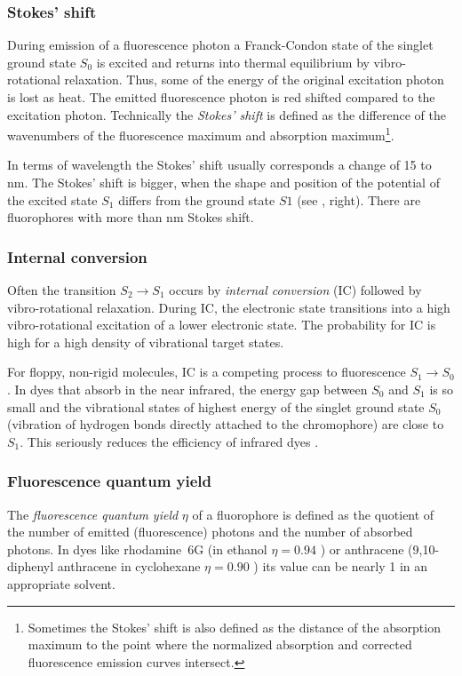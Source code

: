 \subsubsection{Stokes' shift}
During emission of a fluorescence photon a Franck-Condon state of the
singlet ground state $S_0$ is excited and returns into thermal
equilibrium by vibro-rotational relaxation. Thus, some of the energy
of the original excitation photon is lost as heat. The emitted
fluorescence photon is red shifted compared to the excitation
photon. Technically the \emph{Stokes' shift} is defined as the
difference of the wavenumbers of the fluorescence maximum and
absorption maximum\footnote{Sometimes the Stokes' shift is also defined
  as the distance of the absorption maximum to the point where the
  normalized absorption and corrected fluorescence emission curves intersect.}.

In terms of wavelength the Stokes' shift usually corresponds a change
of 15 to \unit[30]{nm}. The Stokes' shift is bigger, when the shape and
position of the potential of the excited state $S_1$ differs from the
ground state $S1$ (see , right). There are
fluorophores with more than \unit[100]{nm} Stokes shift.

\subsubsection{Internal conversion}
Often the transition $S_2\rightarrow S_1$ occurs by \emph{internal
  conversion} (IC) followed by vibro-rotational relaxation. During IC,
the electronic state transitions into a high vibro-rotational
excitation of a lower electronic state. The probability for IC is high
for a high density of vibrational target states.

For floppy, non-rigid molecules, IC is a competing process to
fluorescence $S_1\rightarrow S_0$. In dyes that absorb in the near
infrared, the energy gap between $S_0$ and $S_1$ is so small and the
vibrational states of highest energy of the singlet ground state $S_0$
(vibration of hydrogen bonds directly attached to the chromophore) are
close to $S_1$. This seriously reduces the efficiency of infrared dyes
\citep[p.~43]{Sauer2011}.


\subsubsection{Fluorescence quantum yield}
The \emph{fluorescence quantum yield} $\eta$ of a fluorophore is
defined as the quotient of the number of emitted (fluorescence)
photons and the number of absorbed photons. In dyes like rhodamine~6G
(in ethanol $\eta=0.94$ \cite{Fischer1996}) or anthracene
(9,10-diphenyl anthracene in cyclohexane $\eta=0.90$ \cite{Hamai1983})
its value can be nearly 1 in an appropriate solvent.


